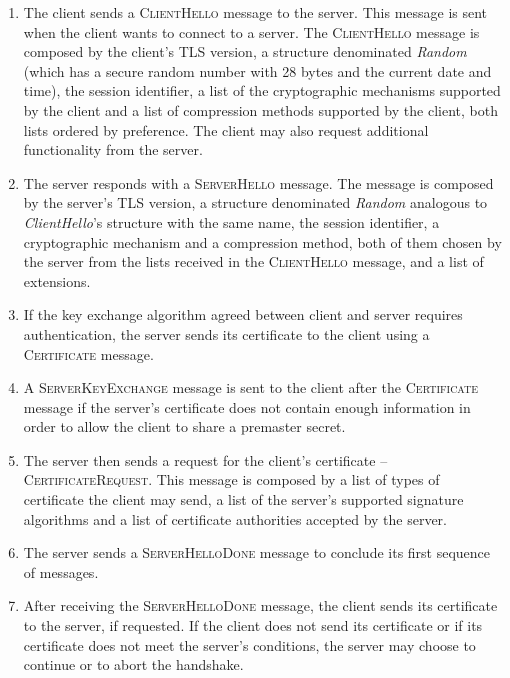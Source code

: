 \documentclass{sig-alternate-05-2015}
\newcommand{\msg}[1]{\textsc{{#1}}}
\begin{document}
\begin{enumerate}

\item {The client sends a \msg{ClientHello} message to the server. This message is sent when the client wants to connect to a server.
The \msg{ClientHello} message is composed by the client's TLS version, a structure denominated \textit{Random} (which has a secure random number with 28 bytes and the current date and time), the session identifier, a list of the cryptographic mechanisms supported by the client and a list of compression methods supported by the client, both lists ordered by preference. The client may also request additional functionality from the server.}


\item {The server responds with a \msg{ServerHello} message. The message is composed by the server's TLS version, a structure denominated \textit{Random} analogous to \textit{ClientHello}'s structure with the same name, the session identifier, a cryptographic mechanism and a compression method, both of them chosen by the server from the lists received in the \msg{ClientHello} message, and a list of extensions.}

\item {If the key exchange algorithm agreed between client and server requires authentication, the server sends its certificate to the client using a \msg{Certificate} message.}

\item {A \msg{ServerKeyExchange} message is sent to the client after the \msg{Certificate} message if the server's certificate does not contain enough information in order to allow the client to share a premaster secret.}

\item {The server then sends a request for the client's certificate -- \msg{CertificateRequest}. This message is composed by a list of types of certificate the client may send, a list of the server's supported signature algorithms and a list of certificate authorities accepted by the server.}

\item {The server sends a \msg{ServerHelloDone} message to conclude its first sequence of messages.}

\item {After receiving the \msg{ServerHelloDone} message, the client sends its certificate to the server, if requested.
If the client does not send its certificate or if its certificate does not meet the server's conditions, the server may choose to continue or to abort the handshake.
}


\end{enumerate}
\end{document}
